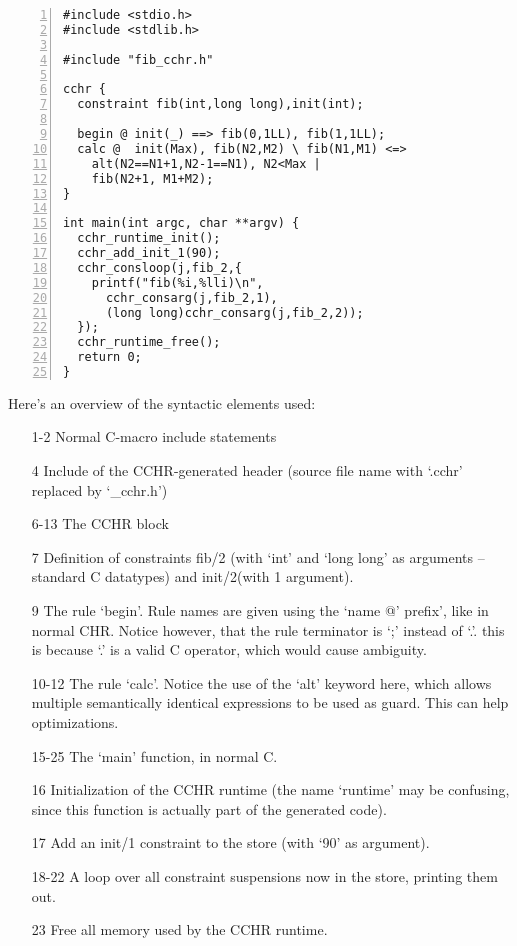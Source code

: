 \documentclass{llncs}
\begin{document}
\begin{Verbatim}[numbers=left]
#include <stdio.h>
#include <stdlib.h>

#include "fib_cchr.h"

cchr {
  constraint fib(int,long long),init(int);

  begin @ init(_) ==> fib(0,1LL), fib(1,1LL);
  calc @  init(Max), fib(N2,M2) \ fib(N1,M1) <=> 
    alt(N2==N1+1,N2-1==N1), N2<Max | 
    fib(N2+1, M1+M2);
}

int main(int argc, char **argv) {
  cchr_runtime_init();
  cchr_add_init_1(90);
  cchr_consloop(j,fib_2,{
    printf("fib(%i,%lli)\n",
      cchr_consarg(j,fib_2,1),
      (long long)cchr_consarg(j,fib_2,2));
  });
  cchr_runtime_free();
  return 0;
}
\end{Verbatim}

Here's an overview of the syntactic elements used: \begin{itemize}
  \item[1-2] Normal C-macro include statements
  \item[4] Include of the CCHR-generated header (source file name with `.cchr' replaced by `\_cchr.h')
  \item[6-13] The CCHR block
  \item[7] Definition of constraints fib/2 (with `int' and `long long' as arguments -- standard C datatypes) and init/2(with 1 argument).
  \item[9] The rule `begin'. Rule names are given using the `name @' prefix', like in normal CHR. Notice however, that the rule terminator is `;' instead of `.'. this is because `.' is a valid C operator, which would cause ambiguity.
  \item[10-12] The rule `calc'. Notice the use of the `alt' keyword here, which allows multiple semantically identical expressions to be used as guard. This can help optimizations.
  \item[15-25] The `main' function, in normal C.
  \item[16] Initialization of the CCHR runtime (the name `runtime' may be confusing, since this function is actually part of the generated code).
  \item[17] Add an init/1 constraint to the store (with `90' as argument).
  \item[18-22] A loop over all constraint suspensions now in the store, printing them out.
  \item[23] Free all memory used by the CCHR runtime.
\end{itemize}
\end{document}
